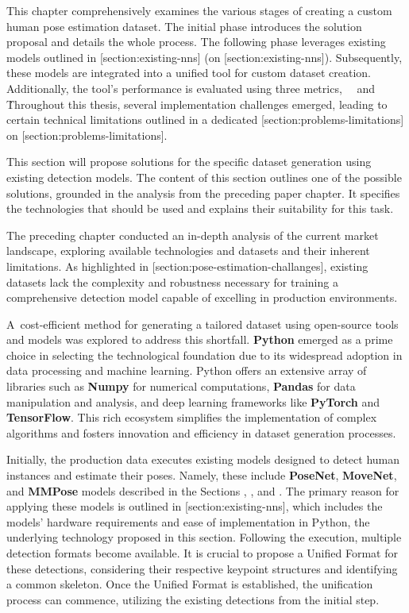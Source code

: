 This chapter comprehensively examines the various stages of creating a custom human pose estimation dataset. The initial phase introduces the solution proposal and details the whole process. The following phase leverages existing models outlined in [section:existing-nns] (on [section:existing-nns]). Subsequently, these models are integrated into a unified tool for custom dataset creation. Additionally, the tool's performance is evaluated using three metrics, \OKS\, \APE\ and \MSE\.

Throughout this thesis, several implementation challenges emerged, leading to certain technical limitations outlined in a dedicated [section:problems-limitations] on [section:problems-limitations].

This section will propose solutions for the specific dataset generation using existing {\bf \NN} detection models. The content of this section outlines one of the possible solutions, grounded in the analysis from the preceding paper chapter. It specifies the technologies that should be used and explains their suitability for this task.

The preceding chapter conducted an in-depth analysis of the current market landscape, exploring available technologies and datasets and their inherent limitations. As highlighted in [section:pose-estimation-challanges], existing datasets lack the complexity and robustness necessary for training a comprehensive detection model capable of excelling in production environments.

A~cost-efficient method for generating a tailored dataset using open-source tools and models was explored to address this shortfall. {\bf Python} emerged as a prime choice in selecting the technological foundation due to its widespread adoption in data processing and machine learning. Python offers an extensive array of libraries such as {\bf Numpy} for numerical computations, {\bf Pandas} for data manipulation and analysis, and deep learning frameworks like {\bf PyTorch} and {\bf TensorFlow}. This rich ecosystem simplifies the implementation of complex algorithms and fosters innovation and efficiency in dataset generation processes.

Initially, the production data executes existing models designed to detect human instances and estimate their poses. Namely, these include {\bf PoseNet}, {\bf MoveNet}, and {\bf MMPose} models described in the Sections , , and . The primary reason for applying these models is outlined in [section:existing-nns], which includes the models' hardware requirements and ease of implementation in Python, the underlying technology proposed in this section. Following the execution, multiple detection formats become available. It is crucial to propose a Unified Format for these detections, considering their respective keypoint structures and identifying a common skeleton. Once the Unified Format is established, the unification process can commence, utilizing the existing detections from the initial step.


